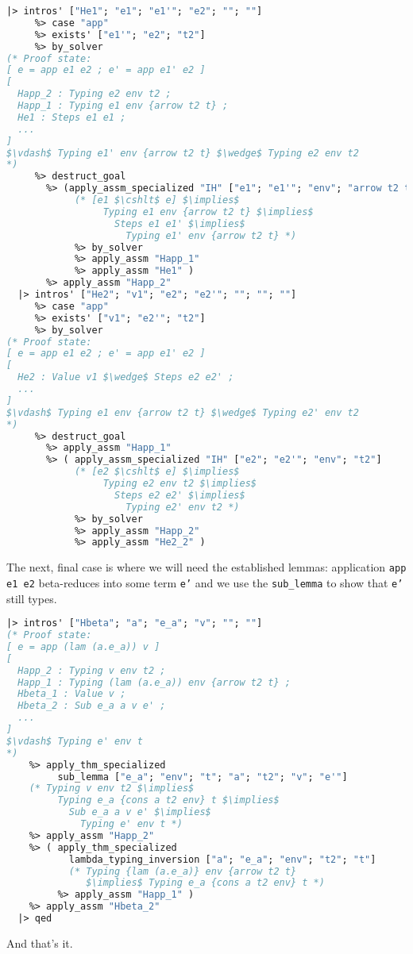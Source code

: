 \documentclass[english, mgr]{iithesis}
\renewcommand{\tt}[1]{\texttt{\small{#1}}}
\begin{document}
\begin{lstlisting}[mathescape, language=OCaml]
  |> intros' ["He1"; "e1"; "e1'"; "e2"; ""; ""]
     %> case "app"
     %> exists' ["e1'"; "e2"; "t2"]
     %> by_solver
(* Proof state:
[ e = app e1 e2 ; e' = app e1' e2 ]
[
  Happ_2 : Typing e2 env t2 ;
  Happ_1 : Typing e1 env {arrow t2 t} ;
  He1 : Steps e1 e1 ;
  ...
]
$\vdash$ Typing e1' env {arrow t2 t} $\wedge$ Typing e2 env t2
*)
     %> destruct_goal
       %> (apply_assm_specialized "IH" ["e1"; "e1'"; "env"; "arrow t2 t"]
            (* [e1 $\cshlt$ e] $\implies$
                 Typing e1 env {arrow t2 t} $\implies$
                   Steps e1 e1' $\implies$
                     Typing e1' env {arrow t2 t} *)
            %> by_solver
            %> apply_assm "Happ_1"
            %> apply_assm "He1" )
       %> apply_assm "Happ_2"
  |> intros' ["He2"; "v1"; "e2"; "e2'"; ""; ""; ""]
     %> case "app"
     %> exists' ["v1"; "e2'"; "t2"]
     %> by_solver
(* Proof state:
[ e = app e1 e2 ; e' = app e1' e2 ]
[
  He2 : Value v1 $\wedge$ Steps e2 e2' ;
  ...
]
$\vdash$ Typing e1 env {arrow t2 t} $\wedge$ Typing e2' env t2
*)
     %> destruct_goal
       %> apply_assm "Happ_1"
       %> ( apply_assm_specialized "IH" ["e2"; "e2'"; "env"; "t2"]
            (* [e2 $\cshlt$ e] $\implies$
                 Typing e2 env t2 $\implies$
                   Steps e2 e2' $\implies$
                     Typing e2' env t2 *)
            %> by_solver
            %> apply_assm "Happ_2"
            %> apply_assm "He2_2" )
\end{lstlisting}
The next, final case is where we will need the established lemmas:
application \tt{app e1 e2} beta-reduces into some term \tt{e'} and we use the \tt{sub\_lemma} to show
that \tt{e'} still types.
\begin{lstlisting}[mathescape, language=OCaml]
  |> intros' ["Hbeta"; "a"; "e_a"; "v"; ""; ""]
(* Proof state:
[ e = app (lam (a.e_a)) v ]
[
  Happ_2 : Typing v env t2 ;
  Happ_1 : Typing (lam (a.e_a)) env {arrow t2 t} ;
  Hbeta_1 : Value v ;
  Hbeta_2 : Sub e_a a v e' ;
  ...
]
$\vdash$ Typing e' env t
*)
    %> apply_thm_specialized
         sub_lemma ["e_a"; "env"; "t"; "a"; "t2"; "v"; "e'"]
    (* Typing v env t2 $\implies$
         Typing e_a {cons a t2 env} t $\implies$
           Sub e_a a v e' $\implies$
             Typing e' env t *)
    %> apply_assm "Happ_2"
    %> ( apply_thm_specialized
           lambda_typing_inversion ["a"; "e_a"; "env"; "t2"; "t"]
           (* Typing {lam (a.e_a)} env {arrow t2 t}
              $\implies$ Typing e_a {cons a t2 env} t *)
         %> apply_assm "Happ_1" )
    %> apply_assm "Hbeta_2"
  |> qed
\end{lstlisting}
And that's it.
\end{document}
